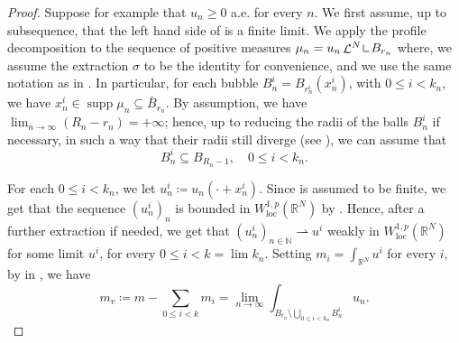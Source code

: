 \documentclass[10pt]{amsart}
\theoremstyle{plain}
\theoremstyle{definition}
\newcommand{\N}{\mathbb{N}}
\newcommand{\R}{\mathbb{R}}
\newcommand{\mres}{\mathop{\hbox{\vrule height 6pt width .5pt depth 0pt \vrule height .5pt width 4pt depth 0pt}}\nolimits}
\newcommand{\loc}{\mathrm{loc}}
\DeclareMathOperator{\supp}{supp}
\DeclareMathOperator{\lbm}{\mathcal{L}}
\newcommand{\weakto}{\rightharpoonup}
\let\oldbigcup\bigcup
\begin{document}
\begin{proof}
Suppose for example that $u_n \geq 0$ a.e. for every $n$. We first assume, up to subsequence, that the left hand side of  is a finite limit. We apply the profile decomposition  to the sequence of positive measures \(\mu_n=u_n \lbm^N \mres B_{r_n}\) where, we assume the extraction \(\sigma\) to be the identity for convenience, and we use the same notation as in . In particular, for each bubble \(B^i_n=B_{r^i_n}(x^i_n)\), with \(0\leq i<k_n\), we have \(x^i_n\in\supp\mu_n\subseteq \bar B_{r_n}\). By assumption, we have \(\lim_{n\to\infty}(R_n-r_n)=+\infty\); hence, up to reducing the radii of the balls \(B^i_n\) if necessary, in such a way that their radii still diverge (see ), we can assume that
\begin{equation}
\label{bubbleStrongInclusion}
B^i_n\subseteq B_{R_n-1},\quad 0\leq i<k_n.
\end{equation}

For each \(0\leq i<k_n\), we let \(u^i_n\coloneqq u_n(\cdot+x^i_n)\). Since  is assumed to be finite, we get that the sequence \((u^i_n)_n\) is bounded in \(W^{1,p}_\loc(\R^N)\) by . Hence, after a further extraction if needed, we get that \((u^i_n)_{n\in\N}\weakto u^i\) weakly in \(W^{1,p}_\loc(\R^N)\) for some limit \(u^i\), for every \(0\leq i<k=\lim k_n\). Setting \(m_i=\int_{\R^N}u^i\) for every $i$, by  in , we have
\[
m_v\coloneqq m-\sum_{0\leq i<k}m_i=\lim_{n\to\infty}\int_{B_{r_n}\setminus\oldbigcup_{0\leq i<k_n}B^i_n}u_n.
\]


\end{proof}
\end{document}

